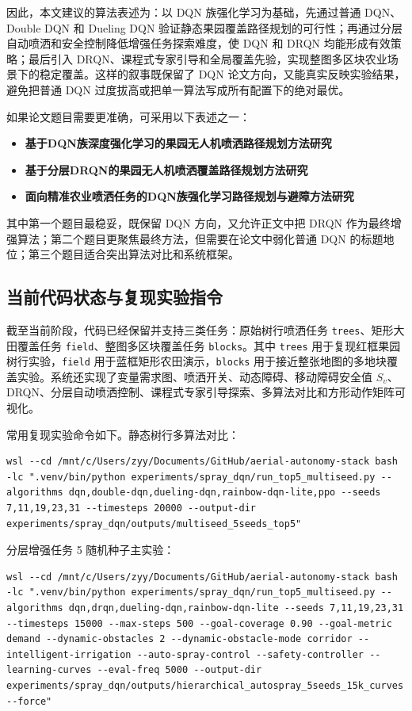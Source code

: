 \documentclass[UTF8]{ctexart}
\begin{document}
因此，本文建议的算法表述为：以 DQN 族强化学习为基础，先通过普通 DQN、Double DQN 和 Dueling DQN 验证静态果园覆盖路径规划的可行性；再通过分层自动喷洒和安全控制降低增强任务探索难度，使 DQN 和 DRQN 均能形成有效策略；最后引入 DRQN、课程式专家引导和全局覆盖先验，实现整图多区块农业场景下的稳定覆盖。这样的叙事既保留了 DQN 论文方向，又能真实反映实验结果，避免把普通 DQN 过度拔高或把单一算法写成所有配置下的绝对最优。

如果论文题目需要更准确，可采用以下表述之一：
\begin{itemize}
  \item \textbf{基于DQN族深度强化学习的果园无人机喷洒路径规划方法研究}
  \item \textbf{基于分层DRQN的果园无人机喷洒覆盖路径规划方法研究}
  \item \textbf{面向精准农业喷洒任务的DQN族强化学习路径规划与避障方法研究}
\end{itemize}
其中第一个题目最稳妥，既保留 DQN 方向，又允许正文中把 DRQN 作为最终增强算法；第二个题目更聚焦最终方法，但需要在论文中弱化普通 DQN 的标题地位；第三个题目适合突出算法对比和系统框架。

\subsection{当前代码状态与复现实验指令}

截至当前阶段，代码已经保留并支持三类任务：原始树行喷洒任务 \texttt{trees}、矩形大田覆盖任务 \texttt{field}、整图多区块覆盖任务 \texttt{blocks}。其中 \texttt{trees} 用于复现红框果园树行实验，\texttt{field} 用于蓝框矩形农田演示，\texttt{blocks} 用于接近整张地图的多地块覆盖实验。系统还实现了变量需求图、喷洒开关、动态障碍、移动障碍安全值 $S_v$、DRQN、分层自动喷洒控制、课程式专家引导探索、多算法对比和方形动作矩阵可视化。

常用复现实验命令如下。静态树行多算法对比：
\begin{verbatim}
wsl --cd /mnt/c/Users/zyy/Documents/GitHub/aerial-autonomy-stack bash -lc ".venv/bin/python experiments/spray_dqn/run_top5_multiseed.py --algorithms dqn,double-dqn,dueling-dqn,rainbow-dqn-lite,ppo --seeds 7,11,19,23,31 --timesteps 20000 --output-dir experiments/spray_dqn/outputs/multiseed_5seeds_top5"
\end{verbatim}

分层增强任务 5 随机种子主实验：
\begin{verbatim}
wsl --cd /mnt/c/Users/zyy/Documents/GitHub/aerial-autonomy-stack bash -lc ".venv/bin/python experiments/spray_dqn/run_top5_multiseed.py --algorithms dqn,drqn,dueling-dqn,rainbow-dqn-lite --seeds 7,11,19,23,31 --timesteps 15000 --max-steps 500 --goal-coverage 0.90 --goal-metric demand --dynamic-obstacles 2 --dynamic-obstacle-mode corridor --intelligent-irrigation --auto-spray-control --safety-controller --learning-curves --eval-freq 5000 --output-dir experiments/spray_dqn/outputs/hierarchical_autospray_5seeds_15k_curves --force"
\end{verbatim}
\end{document}
